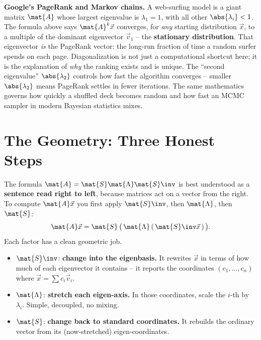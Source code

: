 \begin{applicationbox}
\textbf{Google's PageRank and Markov chains.} A web-surfing model is a giant
matrix $\mat{A}$ whose largest eigenvalue is $\lambda_1 = 1$, with all other
$\abs{\lambda_i} < 1$. The formula above says $\mat{A}^k\vec{x}$ converges, for
\emph{any} starting distribution $\vec{x}$, to a multiple of the dominant
eigenvector $\vec{v}_1$ -- the \textbf{stationary distribution}. That eigenvector
\emph{is} the PageRank vector: the long-run fraction of time a random surfer
spends on each page. Diagonalization is not just a computational shortcut here;
it is the explanation of \emph{why} the ranking exists and is unique. The
``second eigenvalue'' $\abs{\lambda_2}$ controls how fast the algorithm converges
-- smaller $\abs{\lambda_2}$ means PageRank settles in fewer iterations. The same
mathematics governs how quickly a shuffled deck becomes random and how fast an
MCMC sampler in modern Bayesian statistics mixes.
\end{applicationbox}

\section{The Geometry: Three Honest Steps}
\label{ch24:geometry}

The formula $\mat{A} = \mat{S}\mat{\Lambda}\mat{S}\inv$ is best understood as a
\textbf{sentence read right to left}, because matrices act on a vector from the
right. To compute $\mat{A}\vec{x}$ you first apply $\mat{S}\inv$, then
$\mat{\Lambda}$, then $\mat{S}$:
\[
  \mat{A}\vec{x}
  = \mat{S}\,\big(\,\mat{\Lambda}\,(\,\mat{S}\inv\vec{x}\,)\,\big).
\]
Each factor has a clean geometric job.

\begin{itemize}
  \item $\mat{S}\inv$: \textbf{change into the eigenbasis.} It rewrites $\vec{x}$
        in terms of how much of each eigenvector it contains -- it reports the
        coordinates $(c_1,\dots,c_n)$ where $\vec{x}=\sum c_i\vec{v}_i$.
  \item $\mat{\Lambda}$: \textbf{stretch each eigen-axis.} In those coordinates,
        scale the $i$-th by $\lambda_i$. Simple, decoupled, no mixing.
  \item $\mat{S}$: \textbf{change back to standard coordinates.} It rebuilds the
        ordinary vector from its (now-stretched) eigen-coordinates.
\end{itemize}

